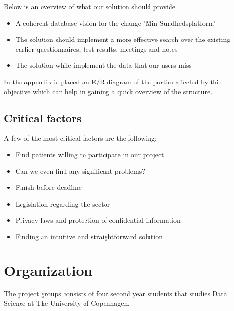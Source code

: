 \documentclass[a4paper,11pt]{article}
\begin{document}

Below is an overview of what our solution should provide 

\begin{itemize}
    \item {A coherent database vision for the change 'Min Sundhedsplatform'}
    \item {The solution should implement a more effective search over the existing earlier questionnaires, test results, meetings and notes}
    \item{The solution while implement the data that our users miss}
\end{itemize}
In the appendix is placed an E/R diagram of the parties affected by this objective which can help in gaining a quick overview of the structure.





\subsection{Critical factors}
A few of the most critical factors are the following:
\begin{itemize}
    \item Find patients willing to participate in our project
    \item Can we even find any significant problems?
    \item Finish before deadline
    \item Legislation regarding the sector
    \item Privacy laws and protection of confidential information
    \item Finding an intuitive and straightforward solution
\end{itemize}

\section{Organization}
The project groups consists of four second year students that studies Data Science at The University of Copenhagen.
\end{document}
